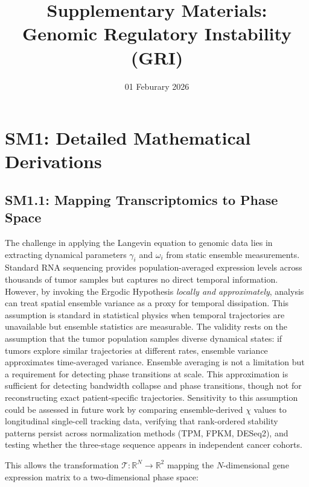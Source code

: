 \documentclass[11pt,letterpaper]{article}
\begin{document}
\title{Supplementary Materials: \\
Genomic Regulatory Instability (GRI)}

\author{}
\date{01 Feburary 2026}

\maketitle

\tableofcontents

\section{SM1: Detailed Mathematical Derivations}

\subsection{SM1.1: Mapping Transcriptomics to Phase Space}

The challenge in applying the Langevin equation to genomic data lies in extracting dynamical parameters $\gamma_i$ and $\omega_i$ from static ensemble measurements. Standard RNA sequencing provides population-averaged expression levels across thousands of tumor samples but captures no direct temporal information. However, by invoking the Ergodic Hypothesis \textit{locally and approximately}, analysis can treat spatial ensemble variance as a proxy for temporal dissipation. This assumption is standard in statistical physics when temporal trajectories are unavailable but ensemble statistics are measurable. The validity rests on the assumption that the tumor population samples diverse dynamical states: if tumors explore similar trajectories at different rates, ensemble variance approximates time-averaged variance. Ensemble averaging is not a limitation but a requirement for detecting phase transitions at scale. This approximation is sufficient for detecting bandwidth collapse and phase transitions, though not for reconstructing exact patient-specific trajectories. Sensitivity to this assumption could be assessed in future work by comparing ensemble-derived $\chi$ values to longitudinal single-cell tracking data, verifying that rank-ordered stability patterns persist across normalization methods (TPM, FPKM, DESeq2), and testing whether the three-stage sequence appears in independent cancer cohorts.

This allows the transformation $\mathcal{T}: \mathbb{R}^N \to \mathbb{R}^2$ mapping the $N$-dimensional gene expression matrix to a two-dimensional phase space:
\end{document}
